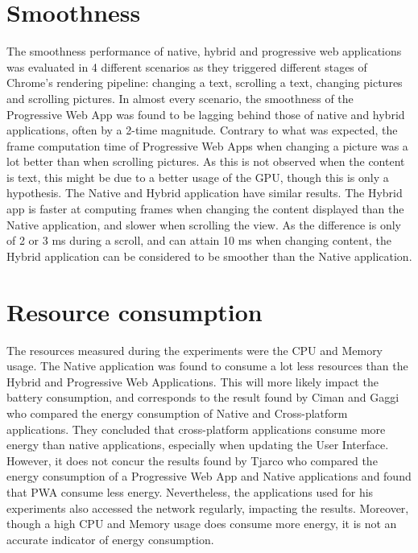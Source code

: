 \documentclass{kththesis}
\begin{document}
\section{Smoothness}
The smoothness performance of native, hybrid and progressive web applications was evaluated in 4 different scenarios as they triggered different stages of Chrome's rendering pipeline: changing a text, scrolling a text, changing pictures and scrolling pictures. In almost every scenario, the smoothness of the Progressive Web App was found to be lagging behind those of native and hybrid applications, often by a 2-time magnitude.\newline
Contrary to what was expected, the frame computation time of Progressive Web Apps when changing a picture was a lot better than when scrolling pictures. As this is not observed when the content is text, this might be due to a better usage of the GPU, though this is only a hypothesis. \newline
The Native and Hybrid application have similar results. The Hybrid app is faster at computing frames when changing the content displayed than the Native application, and slower when scrolling the view. As the difference is only of 2 or 3 ms during a scroll, and can attain 10 ms when changing content, the Hybrid application can be considered to be smoother than the Native application.


\section{Resource consumption}
The resources measured during the experiments were the CPU and Memory usage. The Native application was found to consume a lot less resources than the Hybrid and Progressive Web Applications. This will more likely impact the battery consumption, and corresponds to the result found by Ciman and Gaggi \cite{ciman2017empirical} who compared the energy consumption of Native and Cross-platform applications. They concluded that cross-platform applications consume more energy than native applications, especially when updating the User Interface. However, it does not concur the results found by Tjarco \cite{PWAapplicability} who compared the energy consumption of a Progressive Web App and Native applications and found that PWA consume less energy. Nevertheless, the applications used for his experiments also accessed the network regularly, impacting the results. Moreover, though a high CPU and Memory usage does consume more energy, it is not an accurate indicator of energy consumption.
\end{document}
